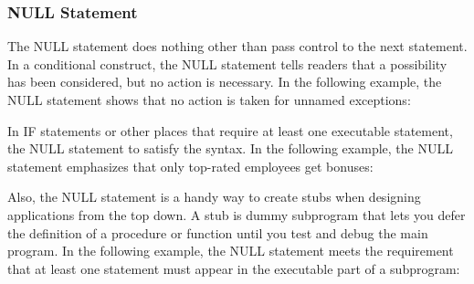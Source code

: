 \subsubsection{NULL Statement}
The NULL statement does nothing other than pass control to the next statement. In a conditional construct, the NULL statement tells readers that a possibility has been considered, but no action is necessary. In the following example, the NULL statement shows that no action is taken for unnamed exceptions:

In IF statements or other places that require at least one executable statement, the NULL statement to satisfy the syntax. In the following example, the NULL statement emphasizes that only top-rated employees get bonuses:

Also, the NULL statement is a handy way to create stubs when designing applications from the top down. A stub is dummy subprogram that lets you defer the definition of a procedure or function until you test and debug the main program. In the following example, the NULL statement meets the requirement that at least one statement must appear in the executable part of a subprogram:

\clearpage